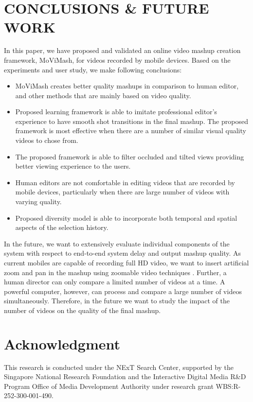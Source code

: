 \documentclass{sig-alternate}
\begin{document}
    \section{CONCLUSIONS \& FUTURE WORK}
    In this paper, we have proposed and validated an online video mashup creation framework, MoViMash, for videos recorded by mobile devices. Based on the experiments and user study, we make following conclusions:
    \begin{itemize}
        \item MoViMash creates better quality mashups in comparison to human editor, and other methods that are mainly based on video quality.
        \item Proposed learning framework is able to imitate professional editor’s experience to have smooth shot transitions in the final mashup. The proposed framework is most effective when there are a number of similar visual quality videos to chose from.
        \item The proposed framework is able to filter occluded and tilted views providing better viewing experience to the users.
        \item Human editors are not comfortable in editing videos that are recorded by mobile devices, particularly when there are large number of videos with varying quality.
        \item Proposed diversity model is able to incorporate both temporal and spatial aspects of the selection history.
    \end{itemize}
    In the future, we want to extensively evaluate individual components of the system with respect to end-to-end system delay and output mashup quality. As current mobiles are capable of recording full HD video, we want to insert artificial zoom and pan in the mashup using zoomable video techniques \cite{11}. Further, a human director can only compare a limited number of videos at a time. A powerful computer, however, can process and compare a large number of videos simultaneously. Therefore, in the future we want to study the impact of the number of videos on the quality of the final mashup.
    
    \section*{Acknowledgment}
    This research is conducted under the NExT Search Center, supported by the Singapore National Research Foundation and the Interactive Digital Media R\&D Program Office of Media Development Authority under research grant WBS:R-252-300-001-490.
    
    
     
    
\end{document}

